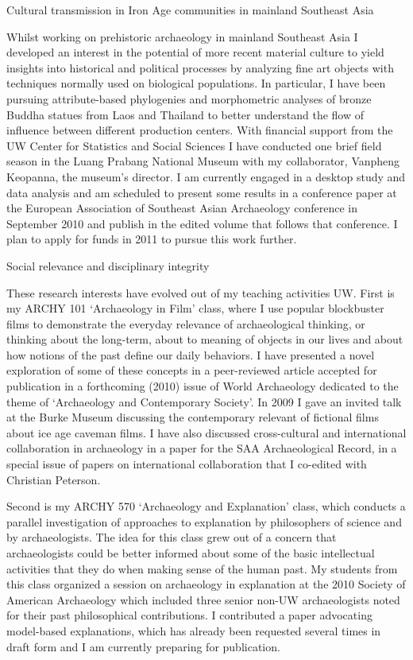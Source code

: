 \documentclass[11pt,article,oneside]{memoir}
\begin{document}
Cultural transmission in Iron Age communities in mainland Southeast Asia

Whilst working on prehistoric archaeology in mainland Southeast Asia I developed an interest in the potential of more recent material culture to yield insights into historical and political processes by analyzing fine art objects with techniques normally used on biological populations. In particular, I have been pursuing attribute-based phylogenies and morphometric analyses of bronze Buddha statues from Laos and Thailand to better understand the flow of influence between different production centers. With financial support from the UW Center for Statistics and Social Sciences I have conducted one brief field season in the Luang Prabang National Museum with my collaborator, Vanpheng Keopanna, the museum’s director. I am currently engaged in a desktop study and data analysis and am scheduled to present some results in a conference paper at the European Association of Southeast Asian Archaeology conference in September 2010 and publish in the edited volume that follows that conference. I plan to apply for funds in 2011 to pursue this work further. 

Social relevance and disciplinary integrity 

These research interests have evolved out of my teaching activities UW. First is my ARCHY 101 ‘Archaeology in Film’ class, where I use popular blockbuster films to demonstrate the everyday relevance of archaeological thinking, or thinking about the long-term, about to meaning of objects in our lives and about how notions of the past define our daily behaviors. I have presented a novel exploration of some of these concepts in a peer-reviewed article accepted for publication in a forthcoming (2010) issue of World Archaeology dedicated to the theme of ‘Archaeology and Contemporary Society’. In 2009 I gave an invited talk at the Burke Museum discussing the contemporary relevant of fictional films about ice age caveman films. I have also discussed cross-cultural and international collaboration in archaeology in a paper for the SAA Archaeological Record, in a special issue of papers on international collaboration that I co-edited with Christian Peterson. 

Second is my ARCHY 570 ‘Archaeology and Explanation’ class, which conducts a parallel investigation of approaches to explanation by philosophers of science and by archaeologists. The idea for this class grew out of a concern that archaeologists could be better informed about some of the basic intellectual activities that they do when making sense of the human past. My students from this class organized a session on archaeology in explanation at the 2010 Society of American Archaeology which included three senior non-UW archaeologists noted for their past philosophical contributions. I contributed a paper advocating model-based explanations, which has already been requested several times in draft form and I am currently preparing for publication.
\end{document}
